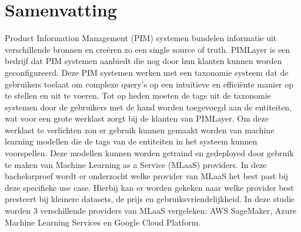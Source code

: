 
%
%
%
%
%

%

\chapter{Samenvatting}
Product Information Management (PIM) systemen bundelen informatie uit verschillende bronnen en creëren zo een single source of truth. PIMLayer is een bedrijf dat PIM systemen aanbiedt die nog door hun klanten kunnen worden geconfigureerd. Deze PIM systemen werken met een taxonomie systeem dat de gebruikers toelaat om complexe query’s op een intuïtieve  en efficiënte manier op te stellen en uit te voeren. Tot op heden moeten de tags uit de taxonomie systemen door de gebruikers met de hand worden toegevoegd aan de entiteiten, wat voor een grote werklast zorgt bij de klanten van PIMLayer. Om deze werklast te verlichten zou er gebruik kunnen gemaakt worden van machine learning modellen die de tags van de entiteiten in het systeem kunnen voorspellen. Deze modellen kunnen worden getraind  en gedeployed door gebruik te maken van Machine Learning as a Service (MLaaS) providers. In deze bachelorproef wordt er onderzocht welke provider van MLaaS het best past bij deze specifieke use case. Hierbij kan er worden gekeken naar  welke provider best presteert bij kleinere datasets, de prijs en gebruiksvriendelijkheid. In deze studie worden 3 verschillende providers van MLaaS vergeleken: AWS SageMaker, Azure Machine Learning Services en Google Cloud Platform. 

